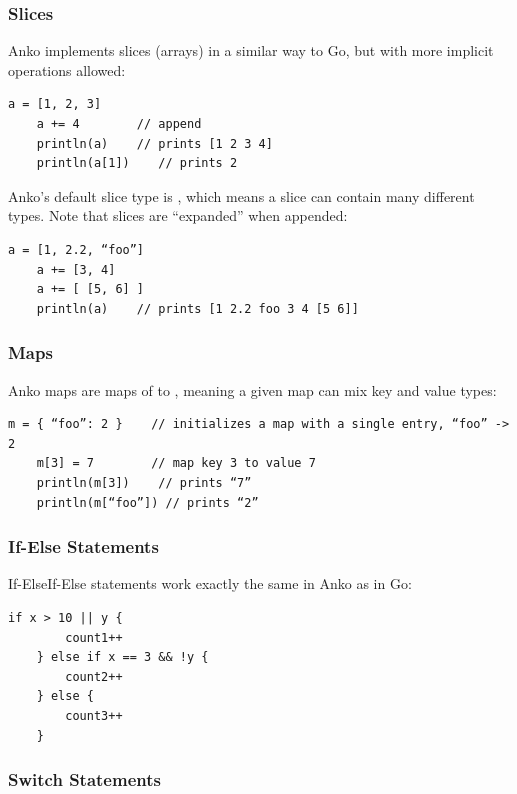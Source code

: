\subsubsection{Slices}

Anko implements slices (arrays) in a similar way to Go, but with more implicit
operations allowed:

\begin{Verbatim}[breaklines=true]
    a = [1, 2, 3]
    a += 4        // append
    println(a)    // prints [1 2 3 4]
    println(a[1])    // prints 2
\end{Verbatim}

Anko's default slice type is , which means a
slice can contain many different types. Note that slices are
``expanded'' when appended:

\begin{Verbatim}[breaklines=true]
    a = [1, 2.2, “foo”]
    a += [3, 4]
    a += [ [5, 6] ]
    println(a)    // prints [1 2.2 foo 3 4 [5 6]]
\end{Verbatim}


\subsubsection{Maps}

Anko maps are maps of  to , meaning a
given map can mix key and value types:

\begin{Verbatim}[breaklines=true]
    m = { “foo”: 2 }    // initializes a map with a single entry, “foo” -> 2
    m[3] = 7        // map key 3 to value 7
    println(m[3])    // prints “7”
    println(m[“foo”]) // prints “2”
\end{Verbatim}


\subsubsection{If-Else Statements}

If-ElseIf-Else statements work exactly the same in Anko as in Go:

\begin{Verbatim}[breaklines=true]
    if x > 10 || y {
        count1++
    } else if x == 3 && !y {
        count2++
    } else {
        count3++
    }
\end{Verbatim}


\subsubsection{Switch Statements}

